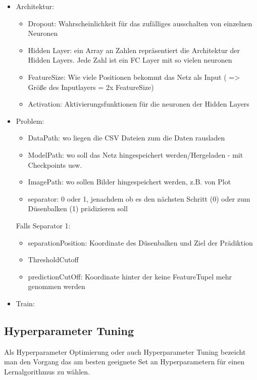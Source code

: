 \begin{itemize}
\item Architektur:
    \begin{itemize}
        \item Dropout: Wahrscheinlichkeit für das zufälliges ausschalten von einzelnen Neuronen
        \item Hidden Layer: ein Array an Zahlen repräsentiert die Architektur der Hidden Layers. Jede Zahl ist ein FC Layer mit so vielen neuronen
        \item FeatureSize: Wie viele Positionen bekommt das Netz als Input ( => Größe des Inputlayers = 2x FeatureSize)
        \item Activation: Aktivierungsfunktionen für die neuronen der Hidden Layers
    \end{itemize}
\item Problem:
    \begin{itemize}
        \item DataPath: wo liegen die CSV Dateien zum die Daten rausladen
        \item ModelPath: wo soll das Netz hingespeichert werden/Hergeladen - mit Checkpoints usw.
        \item ImagePath: wo sollen Bilder hingespeichert werden, z.B. von Plot
        \item separator: 0 oder 1, jenachdem ob es den nächsten Schritt (0) oder zum Düsenbalken (1) prädizieren soll
    \end{itemize}

    Falls Separator 1:
    \begin{itemize}
        \item separationPosition: Koordinate des Düsenbalken und Ziel der Prädiktion
        \item ThresholdCutoff 
        \item predictionCutOff: Koordinate hinter der keine FeatureTupel mehr genommen werden
    \end{itemize}
\item Train:

\end{itemize}


\subsection{Hyperparameter Tuning}

Als Hyperparameter Optimierung oder auch Hyperparameter Tuning bezeicht man den Vorgang das am besten geeignete Set an 
Hyperparametern für einen Lernalgorithmus zu wählen.


